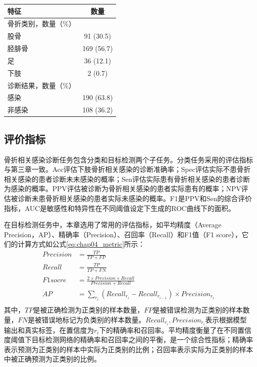 \begin{table}[htbp]
  \centering
  \begin{tabular}{lc}
    \toprule
    特征         & 数量       \\
    \midrule
    骨折类别，数量（\%）      \\
    \quad 股骨   & 91 (30.5)  \\
    \quad 胫腓骨 & 169 (56.7) \\
    \quad 足     & 36 (12.1)  \\
    \quad 下肢   & 2 (0.7)    \\
    诊断结果，数量（\%）      \\
    \quad 感染   & 190 (63.8) \\
    \quad 非感染 & 108 (36.2) \\
    \bottomrule
  \end{tabular}
  \label{tab:chap04_dataset}
\end{table}

\subsection{评价指标}

骨折相关感染诊断任务包含分类和目标检测两个子任务。分类任务采用的评估指标与第三章一致。Acc评估下肢骨折相关感染的诊断准确率；Spec评估实际不患骨折相关感染的患者诊断未未感染的概率；Sen评估实际患有骨折相关感染的患者诊断为感染的概率。PPV评估被诊断为骨折相关感染的患者实际患有的概率；NPV评估被诊断未患骨折相关感染的患者实际未感染的概率。F1是PPV和Sen的综合评价指标，AUC是敏感性和特异性在不同阈值设定下生成的ROC曲线下的面积。

在目标检测任务中，本章选用了常用的评估指标，如平均精度（Average Precision，AP）、精确率（Precision）、召回率（Recall）和F1值（F1 score），它们的计算方式如公式\ref{eq:chap04_metric}所示：
\begin{equation}
  \begin{aligned}
    Precision & = \frac{TP}{TP+FP}                                                   \\
    Recall    & = \frac{TP}{TP+FN}                                                   \\
    F1 socre  & = \frac{2 \times Precision \times Recall}{Precision + Recall}        \\
    AP        & = \sum_{r_i}(Recall_{r_i} - Recall_{r_{i-1}}) \times Precision_{r_i} \\
  \end{aligned}
  \label{eq:chap04_metric}
\end{equation}
其中，\(TP\)是被正确检测为正类别的样本数量，\(FP\)是被错误检测为正类别的样本数量，\(FN\)是被错误地标记为负类别的样本数量。\(Recall_{r_i}, Precision_{r_i}\)表示根据模型输出和真实标签，在置信度为\(r_i\)下的精确率和召回率。平均精度衡量了在不同置信度阈值下目标检测网络的精确率和召回率之间的平衡，是一个综合性指标；精确率表示预测为正类别的样本中实际为正类别的比例；召回率表示实际为正类别的样本中被正确预测为正类别的比例。

